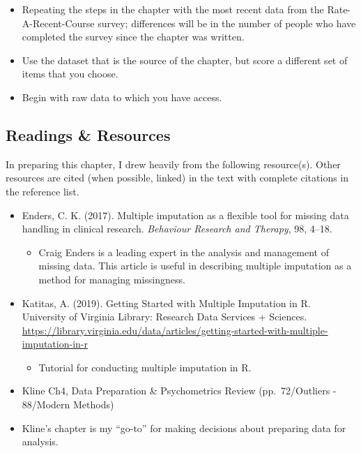 \documentclass[
  11pt,
]{book}
\providecommand{\tightlist}{%
  \setlength{\itemsep}{0pt}\setlength{\parskip}{0pt}}
\begin{document}
\begin{itemize}
\tightlist
\item
  Repeating the steps in the chapter with the most recent data from the Rate-A-Recent-Course survey; differences will be in the number of people who have completed the survey since the chapter was written.
\item
  Use the dataset that is the source of the chapter, but score a different set of items that you choose.
\item
  Begin with raw data to which you have access.
\end{itemize}

\hypertarget{readings-resources-3}{%
\subsection{Readings \& Resources}\label{readings-resources-3}}

In preparing this chapter, I drew heavily from the following resource(s). Other resources are cited (when possible, linked) in the text with complete citations in the reference list.

\begin{itemize}
\tightlist
\item
  Enders, C. K. (2017). Multiple imputation as a flexible tool for missing data handling in clinical research. \emph{Behaviour Research and Therapy}, 98, 4--18.

  \begin{itemize}
  \tightlist
  \item
    Craig Enders is a leading expert in the analysis and management of missing data. This article is useful in describing multiple imputation as a method for managing missingness.
  \end{itemize}
\item
  Katitas, A. (2019). Getting Started with Multiple Imputation in R. University of Virginia Library: Research Data Services + Sciences. \url{https://library.virginia.edu/data/articles/getting-started-with-multiple-imputation-in-r}

  \begin{itemize}
  \tightlist
  \item
    Tutorial for conducting multiple imputation in R.
  \end{itemize}
\item
  Kline Ch4, Data Preparation \& Psychometrics Review (pp.~72/Outliers - 88/Modern Methods)
\item
  Kline's chapter is my ``go-to'' for making decisions about preparing data for analysis.
\end{itemize}
\end{document}
